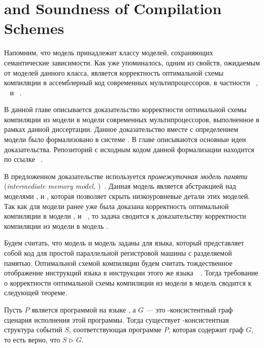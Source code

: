 \chapter{\Wkm and Soundness of Compilation Schemes}
\label{ch:weakestmo-imm}

Напомним, что модель \Wkm принадлежит классу моделей,
сохраняющих семантические зависимости.
Как уже упоминалось, одним из свойств, ожидаемым от моделей данного класса,
является корректность оптимальной схемы компиляции
в ассемблерный код современных мультипроцессоров,
в частности \Intel~\cite{Sewell-al:CACM10},
\ARM~\cite{Pulte-al:POPL18} и \POWER~\cite{Alglave-al:TOPLAS14}.

В данной главе описывается доказательство
корректности оптимальной схемы компиляции из модели \Wkm в модели
современных мультипроцессоров, выполненное в рамках данной диссертации.
Данное доказательство вместе с определением модели \Wkm
было формализовано в системе \coq.
В  главе описываются основные идеи доказательства.
Репозиторий с исходным кодом данной формализации
находится по ссылке~%
\cite{Coq:Weakestmo}.


В предложенном доказательстве используется \emph{промежуточная модель памяти}
(\emph{intermediate memory model, \IMM})~\cite{Podkopaev-al:POPL19}.
Данная модель является абстракцией над моделями \Intel, \ARM и \POWER,
которая позволяет скрыть низкоуровневые детали этих моделей.
Так как для модели \IMM ранее уже была доказана
корректность оптимальной компиляции в модели \Intel, \ARM и \POWER~\cite{Podkopaev-al:POPL19}, 
то задача сводится к доказательству корректности компиляции из модели \Wkm в модель \IMM. 

Будем считать, что модель \Wkm и модель \IMM заданы для языка,
который  представляет собой код для 
простой параллельной регистровой машины с разделяемой памятью.
Оптимальной схемой компиляции будем считать
тождественное отображение инструкций языка \LLANG в инструкции этого же языка~\LLANG~\cite{Podkopaev-al:POPL19}.
Тогда требование о корректности оптимальной схемы компиляции
из модели \Wkm в модель \IMM сводится к следующей теореме. 

\begin{theorem}
  \label{thm:main}
  Пусть $P$ является  программой на языке \LLANG,
  а $G$ --- это \IMM-консистентный граф сценария исполнения этой программы.
  Тогда существует \Wkm-консистентная структура событий $S$,
  соответствующая программе $P$, которая содержит граф $G$, 
  то есть верно, что $S \rhd G$.
\end{theorem}

